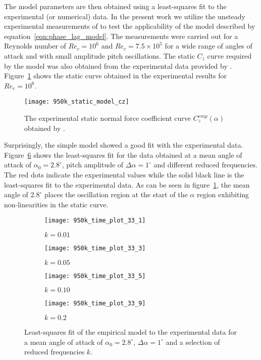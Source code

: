The model parameters are then obtained using a least-squares fit to the experimental (or numerical) data. In the present work we utilize the unsteady experimental measurements of \cite{lokattthesis} to test the applicability of the model described by equation~\ref{eqn:phase_lag_model}. The measurements were carried out for a Reynolds number of $Re_{c}=10^{6}$ and $Re_{c}=7.5\times10^{5}$ for a wide range of angles of attack and with small amplitude pitch oscillations. The static $C_{z}$ curve required by the model was also obtained from the experimental data provided by \cite{lokattthesis}. Figure~\ref{fig:cz_static_exp} shows the static curve obtained in the experimental results for $Re_{c}=10^{6}$.
\begin{figure}[h]
	\centering
	\texttt{[image: 950k\_static\_model\_cz]}
	\vspace{5pt}
	\caption{The experimental static normal force coefficient curve $C_{z}^{emp}(\alpha)$ obtained by \cite{lokattthesis}.}
	\label{fig:cz_static_exp}
\end{figure}
Surprisingly, the simple model showed a good fit with the experimental data. Figure~\ref{fig:model_fits1} shows the least-squares fit for the data obtained at a mean angle of attack of $\alpha_{0}=2.8^{\circ}$, pitch amplitude of $\Delta\alpha=1^{\circ}$ and different reduced frequencies. The red dots indicate the experimental values while the solid black line is the least-squares fit to the experimental data. As can be seen in figure~\ref{fig:cz_static_exp}, the mean angle of $2.8^{\circ}$ places the oscillation region at the start of the $\alpha$ region exhibiting non-linearities in the static curve.
\begin{figure}[h]
	\centering
	\begin{subfigure}[b]{0.45\textwidth}
		\centering
		\texttt{[image: 950k\_time\_plot\_33\_1]}
		\caption{$k=0.01$}
		\label{fig:k_01}
	\end{subfigure}
	\begin{subfigure}[b]{0.45\textwidth}
		\centering
		\texttt{[image: 950k\_time\_plot\_33\_3]}
		\caption{$k=0.05$}
		\label{fig:k_05}
	\end{subfigure}
	\begin{subfigure}[b]{0.45\textwidth}
		\centering
		\texttt{[image: 950k\_time\_plot\_33\_5]}
		\caption{$k=0.10$}
		\label{fig:k_1}
	\end{subfigure}
	\begin{subfigure}[b]{0.45\textwidth}
		\centering
		\texttt{[image: 950k\_time\_plot\_33\_9]}
		\caption{$k=0.2$}
		\label{fig:k_2}
	\end{subfigure}	
	\caption{Least-squares fit of the empirical model to the experimental data for a mean angle of attack of $\alpha_{0}=2.8^{\circ}$, $\Delta\alpha=1^{\circ}$ and a selection of reduced frequencies $k$.}
	\label{fig:model_fits1}
\end{figure}
